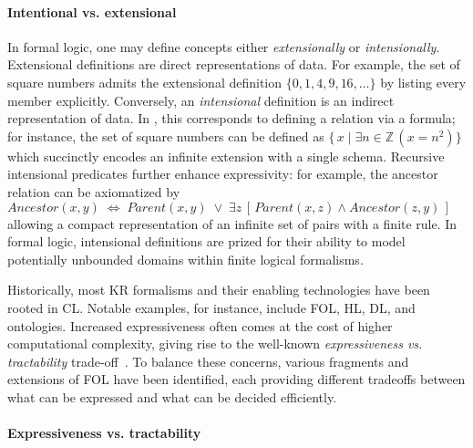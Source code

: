 \paragraph{Intentional vs. extensional}
%
In formal logic, one may define concepts either \emph{extensionally} or \emph{intensionally}.
%
Extensional definitions are direct representations of data.
%
For example, the set of square numbers admits the extensional definition $\{0,1,4,9,16,\dots\}$ by listing every member explicitly.
%
Conversely, an \emph{intensional} definition is an indirect representation of data.
%
In , this corresponds to defining a relation via a formula; for instance, the set of square numbers can be defined as $\{\,x\mid \exists n\in\mathbb{Z}\,(x = n^2)\}$ which succinctly encodes an infinite extension with a single schema.
%
Recursive intensional predicates further enhance expressivity: for example, the ancestor relation can be axiomatized by $\mathit{Ancestor}(x,y)\;\Leftrightarrow\;\mathit{Parent}(x,y)\;\lor\;\exists z\,[\,\mathit{Parent}(x,z)\wedge\mathit{Ancestor}(z,y)\,]$ allowing a compact representation of an infinite set of pairs with a finite rule.
%
In formal logic, intensional definitions are prized for their ability to model potentially unbounded domains within finite logical formalisms.


Historically, most \gls{KR} formalisms and their enabling technologies have been rooted in \gls{CL}.
%
Notable examples, for instance, include \gls{FOL}, \gls{HL}, \gls{DL}, and ontologies.
%
Increased expressiveness often comes at the cost of higher computational complexity, giving rise to the well-known \emph{expressiveness vs. tractability} trade-off~\cite{DBLP:conf/dlog/2003handbook}.
%
To balance these concerns, various fragments and extensions of \gls{FOL} have been identified, each providing different tradeoffs between what can be expressed and what can be decided efficiently.

\paragraph{Expressiveness vs. tractability}
%


\subsection{}\label{subsec:first-order-logic}

\subsection{}\label{subsec:dl}

